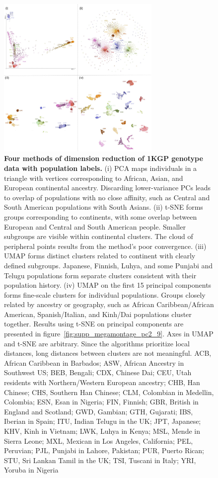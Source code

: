 \documentclass[12pt]{pnas-new}
\begin{document}
\begin{figure}[!ht]
    \centering
    \includegraphics[width=0.7\textwidth]{images/montage_1000G_labels_axes.pdf}
    \caption{\textbf{Four methods of dimension reduction of 1KGP genotype data with population labels.} (i) PCA maps individuals in a triangle with vertices corresponding to African, Asian, and European continental ancestry. Discarding lower-variance PCs leads to overlap of populations with no close affinity, such as Central and South American populations with South Asians. (ii) t-SNE forms groups corresponding to continents, with some overlap between European and Central and South American people. Smaller subgroups are visible within continental clusters. The cloud of peripheral points results from the method's poor convergence. (iii) UMAP forms distinct clusters related to continent with clearly defined subgroups. Japanese, Finnish, Luhya, and some Punjabi and Telugu populations form separate clusters consistent with their population history\cite{10002015global}. (iv) UMAP on the first 15 principal components forms fine-scale clusters for individual populations. Groups closely related by ancestry or geography, such as African Caribbean/African American, Spanish/Italian, and Kinh/Dai populations cluster together. Results using t-SNE on principal components are presented in figure~\ref{fig:supp_megamontage_pc2_9}. Axes in UMAP and t-SNE are arbitrary. Since the algorithms prioritize local distances, long distances between clusters are not meaningful.
    ACB, African Caribbean in Barbados;
    ASW, African Ancestry in Southwest US;
    BEB, Bengali;
    CDX, Chinese Dai;
    CEU, Utah residents with Northern/Western European ancestry;
    CHB, Han Chinese;
    CHS, Southern Han Chinese;
    CLM, Colombian in Medellin, Colombia;
    ESN, Esan in Nigeria;
    FIN, Finnish;
    GBR, British in England and Scotland;
    GWD, Gambian;
    GTH, Gujarati;
    IBS, Iberian in Spain;
    ITU, Indian Telugu in the UK;
    JPT, Japanese;
    KHV, Kinh in Vietnam;
    LWK, Luhya in Kenya;
    MSL, Mende in Sierra Leone;
    MXL, Mexican in Los Angeles, California;
    PEL, Peruvian;
    PJL, Punjabi in Lahore, Pakistan;
    PUR, Puerto Rican;
    STU, Sri Lankan Tamil in the UK;
    TSI, Tuscani in Italy;
    YRI, Yoruba in Nigeria}
    \label{fig:1000g_compare}
\end{figure}
\end{document}
